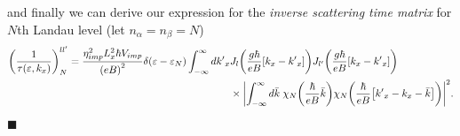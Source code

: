 and finally we can derive our expression for the \textit{inverse
scattering time matrix} for $N$th Landau level (let $n_{\alpha} = n_{\beta} = N$)
\begin{equation} \label{4.65}
  \begin{aligned}
    \qty(\frac{1}{\tau(\varepsilon,k_x)})^{ll'}_{N} =
    \frac { \eta_{imp}^2 L_x^2 \hbar V_{imp}}{\qty(eB)^2}
    \delta(\varepsilon - \varepsilon_{N})
    \int_{-\infty}^{\infty} d {k'}_x
    &
    J_l\qty(\frac{g\hbar}{eB}[{k}_x - {k'}_x])
    J_{l'}\qty(\frac{g\hbar}{eB}[{k}_x - {k'}_x]) \\
    & \times
    \qty|
    \int_{-\infty}^{\infty} d\bar{k} \;
    {\chi}_{N}\qty(\frac{\hbar}{eB}\bar{k})
    {\chi}_{N}\qty(\frac{\hbar}{eB} \qty[{k'}_x - {k}_x - \bar{k}])|^2.
  \end{aligned}
\end{equation}
\hfill$\blacksquare$
